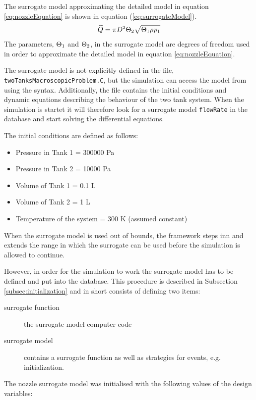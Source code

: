 The surrogate model approximating the detailed model in equation \ref{eq:nozzleEquation} is shown in equation (\ref{eq:surrogateModel}).
\begin{equation}
    \widetilde{Q} = 
    \pi D^2 \Theta_2 
    \sqrt{ \Theta_1 \rho_{} p_1}
    \label{eq:surrogateModel}
\end{equation}
The parameters, $\Theta_1$ and $\Theta_2$, in the surrogate model are degrees of freedom used in order to approximate the detailed model in equation \ref{eq:nozzleEquation}.
%
\par
%
The surrogate model is not explicitly defined in the file, \texttt{twoTanksMacroscopicProblem.C}, but the simulation can access the model from {\MongoDB} using the {\MoDeNa} syntax.
Additionally, the file contains the initial conditions and dynamic equations describing the behaviour of the two tank system. 
When the simulation is startet it will therefore look for a surrogate model \texttt{flowRate} in the database and start solving the differential equations. 
%
\par
%
The initial conditions are defined as follows:
\begin{itemize}
 \item Pressure in Tank 1 = 300000 Pa
 \item Pressure in Tank 2 = 10000 Pa
 \item Volume of Tank 1 = 0.1 L
 \item Volume of Tank 2 = 1 L
 \item Temperature of the system = 300 K (assumed constant)
\end{itemize}
%
When the surrogate model is used out of bounds, the {\MoDeNa} framework steps inn and extends the range in which the surrogate can be used before the simulation is allowed to continue.
%
\par
%
However, in order for the simulation to work the surrogate model has to be defined and put into the database. 
This procedure is described in Subsection \ref{subsec:initialization} and in short consists of defining two items:
\begin{description}
    \item[surrogate function] the surrogate model computer code
    \item[surrogate model] contains a surrogate function as well as strategies for events, e.g. initialization. 
\end{description}
The nozzle surrogate model was initialised with the following values of the design variables:
